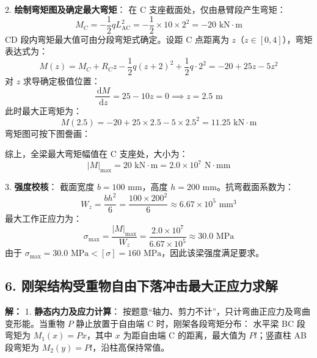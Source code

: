 \documentclass[11pt,a4paper]{ctexrep}
\newcommand{\diff}{\,\mathrm{d}}
\begin{document}
{2. \textbf{绘制弯矩图及确定最大弯矩}：
在 C 支座截面处，仅由悬臂段产生弯矩：
  \[
  M_C = -\frac{1}{2} q L_{\mathrm{AC}}^2 = -\frac{1}{2} \times 10 \times 2^2 = -20\text{ kN}\cdot\text{m}
  \]
CD 段内弯矩最大值可由分段弯矩式确定。设距 C 点距离为 $z$（$z \in [0, 4]$），弯矩表达式为：
  \[
  M(z) = M_C + R_C z - \frac{1}{2} q (z+2)^2 + \frac{1}{2} q \cdot 2^2 = -20 + 25 z - 5 z^2
  \]
  对 $z$ 求导确定极值位置：
  \[
  \frac{\diff M}{\diff z} = 25 - 10 z = 0 \implies z = 2.5\text{ m}
  \]
  此时最大正弯矩为：
  \[
  M(2.5) = -20 + 25 \times 2.5 - 5 \times 2.5^2 = 11.25\text{ kN}\cdot\text{m}
  \]
弯矩图可按下图誊画：
\begin{center}
\end{center}
综上，全梁最大弯矩幅值在 C 支座处，大小为：
\[
|M|_{\max} = 20\text{ kN}\cdot\text{m} = 2.0 \times 10^7\text{ N}\cdot\text{mm}
\]

3. \textbf{强度校核}：
截面宽度 $b = 100\text{ mm}$，高度 $h = 200\text{ mm}$。抗弯截面系数为：
\[
W_z = \frac{b h^2}{6} = \frac{100 \times 200^2}{6} \approx 6.67 \times 10^5\text{ mm}^3
\]
最大工作正应力为：
\[
\sigma_{\max} = \frac{|M|_{\max}}{W_z} = \frac{2.0 \times 10^7}{6.67 \times 10^5} \approx 30.0\text{ MPa}
\]
由于 $\sigma_{\max} = 30.0\text{ MPa} < [\sigma] = 160\text{ MPa}$，因此该梁强度满足要求。

\subsection*{6. 刚架结构受重物自由下落冲击最大正应力求解}
\textbf{解：}
1. \textbf{静态内力及应力计算}：
按题意“轴力、剪力不计”，只计弯曲正应力及弯曲变形能。当重物 $P$ 静止放置于自由端 C 时，刚架各段弯矩分布：
水平梁 BC 段弯矩为 $M_1(x)=Px$，其中 $x$ 为距自由端 C 的距离，最大值为 $Pl$；竖直柱 AB 段弯矩为 $M_2(y)=Pl$，沿柱高保持常值。

}
\end{document}
